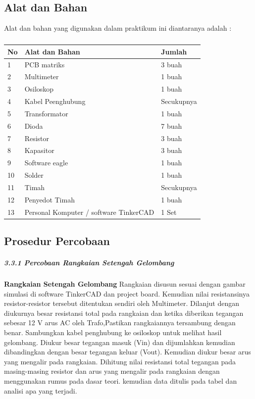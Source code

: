 \documentclass[12pt,a4paper]{article}
\begin{document}
\subsection{Alat dan Bahan}
Alat dan bahan yang digunakan dalam praktikum ini diantaranya adalah : 
\subparagraph*{ }
\begin{tabular}{|l|l|l|}  \hline
No & Alat dan Bahan  & Jumlah  \\ \hline
1  & PCB matriks & 3 buah \\ \hline
2  & Multimeter & 1 buah \\ \hline
3  & Osiloskop & 1 buah \\ \hline
4  & Kabel Peenghubung & Secukupnya \\ \hline
5  & Transformator & 1 buah \\ \hline
6  & Dioda & 7 buah \\ \hline
7  & Resistor & 3 buah \\ \hline
8  & Kapasitor & 3 buah \\ \hline
9  & Software eagle & 1 buah \\ \hline
10 & Solder & 1 buah \\ \hline
11 & Timah & Secukupnya \\ \hline
12 & Penyedot Timah & 1 buah \\ \hline
13 & Personal Komputer / software TinkerCAD & 1 Set \\ \hline

\end{tabular}

\subsection{Prosedur Percobaan}
	\subparagraph{3.3.1 Percobaan Rangkaian Setengah Gelombang}
	\subparagraph{ }
\textbf{Rangkaian Setengah Gelombang} Rangkaian disusun sesuai dengan gambar simulasi di software TinkerCAD dan project board. Kemudian nilai resistansinya resistor-resistor tersebut ditentukan sendiri oleh Multimeter. Dilanjut dengan diukurnya besar resistansi total pada rangkaian dan ketika diberikan tegangan sebesar 12 V arus AC oleh Trafo,Pastikan rangkaiannya tersambung dengan benar. Sambungkan kabel penghubung ke osiloskop untuk melihat hasil gelombang. Diukur besar tegangan masuk (Vin) dan dijumlahkan kemudian dibandingkan dengan besar tegangan keluar (Vout). Kemudian diukur besar arus yang mengalir pada rangkaian. Dihitung nilai resistansi total tegangan pada masing-masing resistor dan arus yang mengalir pada rangkaian dengan menggunakan rumus pada dasar teori. kemudian data ditulis pada tabel dan analisi apa yang terjadi.
\end{document}
